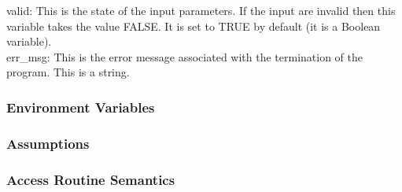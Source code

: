 \documentclass[12pt, titlepage]{article}
\begin{document}
\noindent valid: This is the state of the input parameters. If the input are invalid then this variable takes the value FALSE. It is set to TRUE by default (it is a Boolean variable).
\\

\noindent err\_msg: This is the error message associated with the termination of the program. This is a string. 

\subsubsection{Environment Variables}

\subsubsection{Assumptions}

\subsubsection{Access Routine Semantics}
\end{document}
